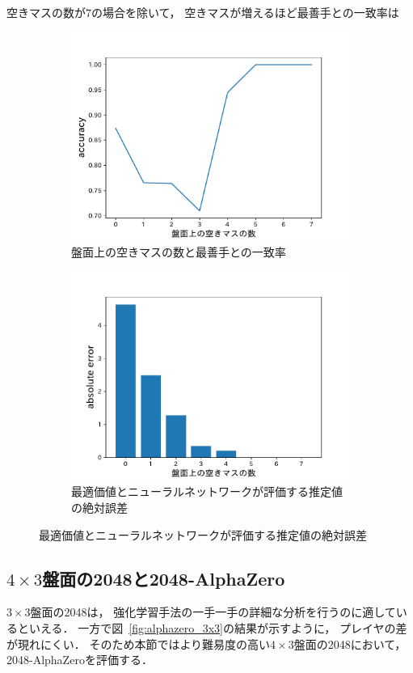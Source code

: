 空きマスの数が$7$の場合を除いて， 空きマスが増えるほど最善手との一致率は
\begin{figure}
    \begin{subfigure}[T]{0.5\columnwidth}
        \centering
        \includegraphics[width=\columnwidth]{figures/empty_tiles_accuracy.pdf}
        \caption{盤面上の空きマスの数と最善手との一致率}
        \label{fig:empty_tiles_accuracy}
    \end{subfigure}
    \begin{subfigure}[T]{0.5\columnwidth}
        \centering
        \includegraphics[width=\columnwidth]{figures/empty_tiles_abs_error.pdf}
        \caption{最適価値とニューラルネットワークが評価する推定値の絶対誤差}
        \label{fig:empty_tiles_abs_error}
    \end{subfigure}
\end{figure}

\subsection{$4\times3$盤面の2048と2048-AlphaZero}
$3\times3$盤面の2048は， 強化学習手法の一手一手の詳細な分析を行うのに適しているといえる．
一方で図~\ref{fig:alphazero_3x3}の結果が示すように， プレイヤの差が現れにくい．
そのため本節ではより難易度の高い$4\times3$盤面の2048において， 2048-AlphaZeroを評価する．